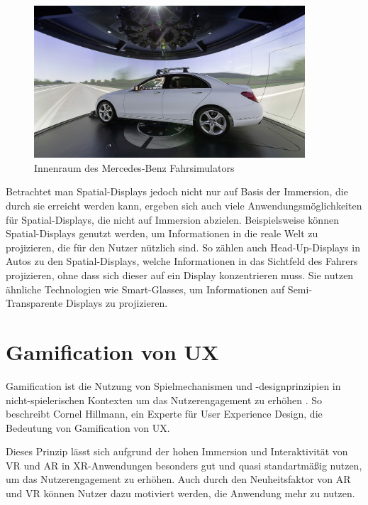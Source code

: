   \begin{figure}[H]
    \centering
    \includegraphics[width=0.9\textwidth]{images/merc-sim.png}
    \caption{Innenraum des Mercedes-Benz Fahrsimulators}
    \label{fig:merc-sim}
  \end{figure}

  Betrachtet man Spatial-Displays jedoch nicht nur auf Basis der Immersion, die durch sie erreicht werden kann, ergeben sich auch viele Anwendungsmöglichkeiten für Spatial-Displays, die nicht auf Immersion abzielen.
  Beispielsweise können Spatial-Displays genutzt werden, um Informationen in die reale Welt zu projizieren, die für den Nutzer nützlich sind.
  So zählen auch Head-Up-Displays in Autos zu den Spatial-Displays, welche Informationen in das Sichtfeld des Fahrers projizieren, ohne dass sich dieser auf ein Display konzentrieren muss.
  Sie nutzen ähnliche Technologien wie Smart-Glasses, um Informationen auf Semi-Transparente Displays zu projizieren.

  
\section{Gamification von UX}
\label{sec:gamification-ux}

\glqq{}Gamification ist die Nutzung von Spielmechanismen und -designprinzipien in nicht-spielerischen Kontexten um das Nutzerengagement zu erhöhen\grqq{} \autocite[][S.63]{hillmann2021ux}.
So beschreibt Cornel Hillmann, ein Experte für User Experience Design, die Bedeutung von Gamification von UX.

Dieses Prinzip lässt sich aufgrund der hohen Immersion und Interaktivität von VR und AR in XR-Anwendungen besonders gut und quasi standartmäßig nutzen, um das Nutzerengagement zu erhöhen.
Auch durch den Neuheitsfaktor von AR und VR können Nutzer dazu motiviert werden, die Anwendung mehr zu nutzen.

